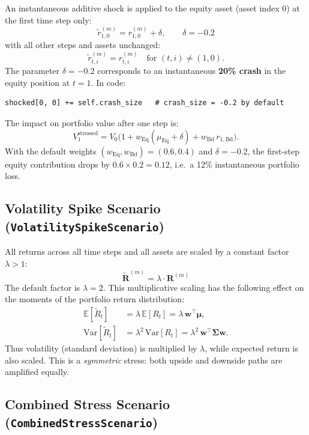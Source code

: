 \documentclass[12pt, a4paper]{article}
\begin{document}
An instantaneous additive shock is applied to the equity asset (asset index 0)
at the first time step only:
\begin{equation}
    \boxed{\widetilde{r}^{(m)}_{1,0} = r^{(m)}_{1,0} + \delta, \qquad \delta = -0.2}
    \label{eq:equity_crash}
\end{equation}
with all other steps and assets unchanged:
\[
    \widetilde{r}^{(m)}_{t,i} = r^{(m)}_{t,i} \quad \text{for } (t,i) \neq (1,0).
\]
The parameter $\delta = -0.2$ corresponds to an instantaneous \textbf{20\% crash}
in the equity position at $t=1$. In code:
\begin{lstlisting}
shocked[0, 0] += self.crash_size   # crash_size = -0.2 by default
\end{lstlisting}
The impact on portfolio value after one step is:
\[
    V^{\text{stressed}}_1 = V_0\bigl(1 + w_{\text{Eq}}(\mu_{\text{Eq}} + \delta)
    + w_{\text{Bd}}\,r_{1,\text{Bd}}\bigr).
\]
With the default weights $(w_{\text{Eq}}, w_{\text{Bd}}) = (0.6, 0.4)$ and
$\delta = -0.2$, the first-step equity contribution drops by
$0.6 \times 0.2 = 0.12$, i.e.\ a 12\% instantaneous portfolio loss.

\subsection{Volatility Spike Scenario (\texttt{VolatilitySpikeScenario})}

All returns across all time steps and all assets are scaled by a constant factor
$\lambda > 1$:
\begin{equation}
    \boxed{\widetilde{\mathbf{R}}^{(m)} = \lambda \cdot \mathbf{R}^{(m)}}
    \label{eq:vol_spike}
\end{equation}
The default factor is $\lambda = 2$. This multiplicative scaling has the
following effect on the moments of the portfolio return distribution:
\begin{align}
    \mathbb{E}[\widetilde{R}_t] &= \lambda\,\mathbb{E}[R_t] = \lambda\,\bm{w}^\top\bm{\mu}, \\
    \mathrm{Var}[\widetilde{R}_t] &= \lambda^2\,\mathrm{Var}[R_t]
        = \lambda^2\,\bm{w}^\top\bm{\Sigma}\bm{w}.
\end{align}
Thus volatility (standard deviation) is multiplied by $\lambda$, while expected
return is also scaled. This is a \textit{symmetric} stress: both upside and
downside paths are amplified equally.

\subsection{Combined Stress Scenario (\texttt{CombinedStressScenario})}
\end{document}
